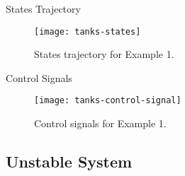 \begin{slide}{States Trajectory}
  \begin{figure}[ht!]
    \centering
    \captionsetup{justification=centering}
    \texttt{[image: tanks-states]}
    \caption{States trajectory for Example 1.}%
    \label{fig:level-system-control-states}
  \end{figure}
  \vspace*{\fill}
\end{slide}

\begin{slide}{Control Signals}
  \vspace*{\fill}
  \begin{figure}[ht!]
    \centering
    \captionsetup{justification=centering}
    \texttt{[image: tanks-control-signal]}
    \caption{Control signals for Example 1.}%
    \label{fig:level-system-control-signals}
  \end{figure}
\end{slide}

\subsection{Unstable System}%
\label{subsec:unstable-system}

